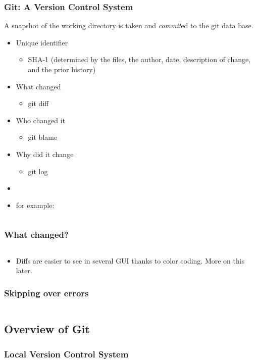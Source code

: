 \begin{frame}
  \frametitle{Git: A Version Control System}
  A snapshot of the working directory is taken and \emph{commit}ed to the git data base.
  \begin{itemize}
    \item Unique identifier
      \begin{itemize}
        \item SHA-1 (determined by the files, the author, date, description of change, and the prior history)
      \end{itemize}
    \item What changed \begin{itemize} \item  git diff \end{itemize}
    \item Who changed it \begin{itemize} \item git blame \end{itemize}
    \item Why did it change \begin{itemize} \item git log \end{itemize}
    \item[]
    \item for example:
  \end{itemize}
\end{frame}

\begin{frame}[t,fragile]
  \tiny
  \inputminted{text}{eglog.log}
\end{frame}

\begin{frame}[t,fragile]
  \frametitle{What changed?}
  \small
  \inputminted{text}{egdiff}

  \normalsize
  \begin{itemize}
    \item Diffs are easier to see in several GUI thanks to color coding. More on
      this later.
  \end{itemize}
\end{frame}

\begin{frame}[t,fragile]
  \frametitle{Skipping over errors}
  \small
  \inputminted[firstline=1,lastline=10]{text}{eglog.log}
\end{frame}

\subsection{Overview of Git}

\begin{frame}
  \frametitle{Local Version Control System}
\end{frame}

